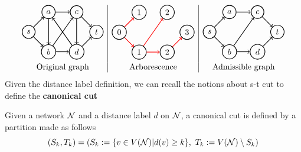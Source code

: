 \[
    \begin{array}{c|c|c}
        
    
    \begin{tikzpicture}[node distance={12mm}, thick , main/.style = {draw, circle}] 
    \node[main] (1) {$s$}; 
    \node[main] (2) [above right of=1] {$a$};
    \node[main] (3) [below right of=1] {$b$};
    \node[main] (4) [right of=2] {$c$};
    \node[main] (5) [right of=3] {$d$};
    \node[main] (6) [above right of=5] {$t$};
    \draw[->] (1) to (2);
    \draw[->] (1) to (3);
    \draw[->] (3) to (5);
    \draw[->] (2) to (4);
    \draw[->] (5) to (6);
    \draw[->] (4) to (6);
    \draw[->] (3) to (4);
    \draw[->] (4) to (5);
    \draw[->] (5) to (2);
    \draw[->] (2) to (3);
\end{tikzpicture}  &
\begin{tikzpicture}[node distance={12mm}, thick , main/.style = {draw, circle}] 
    \node[main] (1) {$0$}; 
    \node[main] (2) [above right of=1] {$1$};
    \node[main] (3) [below right of=1] {$1$};
    \node[main] (4) [right of=2] {$2$};
    \node[main] (5) [right of=3] {$2$};
    \node[main] (6) [above right of=5] {$3$};
    \draw[->, red] (1) to (2);
    \draw[->, red] (1) to (3);
    \draw[->, red] (3) to (5);
    \draw[->, red] (5) to (6);
    \draw[->, red] (3) to (4);
\end{tikzpicture} &
\begin{tikzpicture}[node distance={12mm}, thick , main/.style = {draw, circle}] 
    \node[main] (1) {$s$}; 
    \node[main] (2) [above right of=1] {$a$};
    \node[main] (3) [below right of=1] {$b$};
    \node[main] (4) [right of=2] {$c$};
    \node[main] (5) [right of=3] {$d$};
    \node[main] (6) [above right of=5] {$t$};
    \draw[->] (1) to (2);
    \draw[->] (1) to (3);
    \draw[->] (3) to (5);
    \draw[->] (5) to (6);
    \draw[->] (3) to (4);
    \draw[->] (2) to (4);
    \draw[->] (4) to (6);
\end{tikzpicture} \\
\text{Original graph}&\text{Arborescence} & \text{Admissible graph}
\end{array} 
\]
Given the distance label definition, we can recall the notions about s-t cut to define the \textbf{canonical cut}
\begin{definition}
    \label{cancut}
    Given a network $\mathcal{N}$ and a distance label $d$ on $\mathcal{N}$, a canonical cut is defined by a partition made as follows
    \[(S_k, T_k) =  (S_k:=\{v\in V(\mathcal{N}) | d(v) \ge k\},\ T_k := V(\mathcal{N})\setminus S_k)\]
\end{definition}

